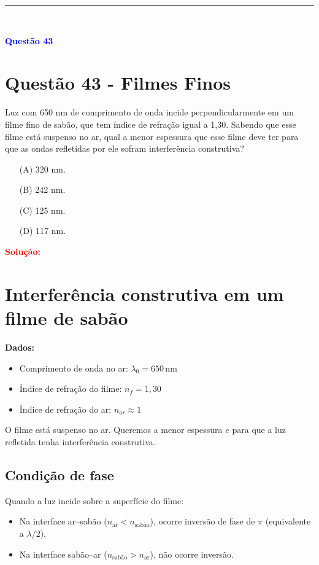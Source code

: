 \documentclass[a4paper,12pt]{article}
\begin{document}
\noindent\rule{\linewidth}{0.6pt}\\

\begin{flushleft}
\textbf{\textcolor{blue}{\Large Quest\~ao 43}}\\
\noindent
\section{Quest\~ao 43 - Filmes Finos}
Luz com 650 nm de comprimento de onda incide
perpendicularmente em um filme fino de sabão, que tem
índice de refração igual a 1,30. Sabendo que esse filme está
suspenso no ar, qual a menor espessura que esse filme
deve ter para que as ondas refletidas por ele sofram
interferência construtiva?

\begin{itemize}
\item[(A)] 320 nm.
\item[(B)] 242 nm.
\item[(C)] 125 nm.
\item[(D)] 117 nm.
\end{itemize}

\vspace{0.5cm}

\textcolor{red}{\textbf{Solução:}}\\

\section*{Interferência construtiva em um filme de sabão}

\textbf{Dados:}
\begin{itemize}
    \item Comprimento de onda no ar: \( \lambda_0 = 650\,\mathrm{nm} \)
    \item Índice de refração do filme: \( n_f = 1{,}30 \)
    \item Índice de refração do ar: \( n_{ar} \approx 1 \)
\end{itemize}

O filme está suspenso no ar. Queremos a menor espessura \(e\) para que a luz refletida tenha interferência construtiva.

\subsection*{Condição de fase}

Quando a luz incide sobre a superfície do filme:
\begin{itemize}
    \item Na interface ar–sabão (\(n_\text{ar} < n_\text{sabão}\)), ocorre inversão de fase de \(\pi\) (equivalente a \(\lambda/2\)).
    \item Na interface sabão–ar (\(n_\text{sabão} > n_\text{ar}\)), não ocorre inversão.
\end{itemize}


\end{flushleft}
\end{document}

